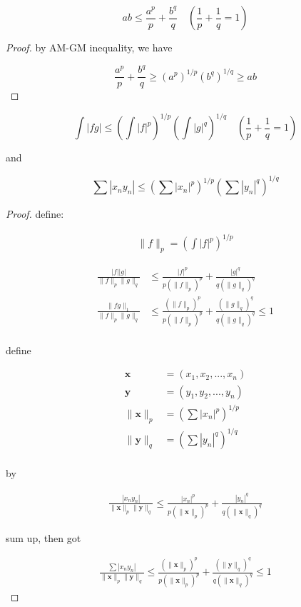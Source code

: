\documentclass[11pt,a4paper]{article}
\begin{document}
\begin{thm}
    \[
        ab \le \frac{a^p}{p} + \frac{b^q}{q} \quad \left( \frac{1}{p} + \frac{1}{q} = 1\right)
    \]
\end{thm}

\begin{proof}
   by AM-GM inequality, we have 

   \[
\frac{a^p}{p} + \frac{b^q}{q} \ge (a^p)^{1/p} (b^q)^{1/q} \ge ab
   \]
\end{proof}

\begin{thm}
    \[
        \int |fg| \le  \left(\int |f|^p \right)^{1/p} \left(\int |g|^q \right)^{1/q} \quad \left( \frac{1}{p} + \frac{1}{q} = 1\right)
    \] 

    and

    \[
        \sum |x_n y_n| \le \left(\sum |x_n|^p \right)^{1/p} \left(\sum |y_n|^q \right)^{1/q}
    \]
\end{thm}

\begin{proof}
    define:

    \begin{align*}
        \| f\|_p = \left(\int |f|^p \right)^{1/p}
    \end{align*}

   \begin{align*}
      \frac{|f||g|}{\| f\|_p\| g\|_q}  &\le \frac{|f|^p}{p (\| f\|_p)^p} +  \frac{|g|^q}{ q (\| g\|_q)^q} \\
      \frac{\| fg \|_1}{\| f\|_p\| g\|_q}  &\le \frac{(\| f\|_p)^p}{p (\| f\|_p)^p} +  \frac{(\| g\|_q)^q}{ q (\| g\|_q)^q} \le 1\\ 
   \end{align*} 

   define

   \begin{align*}
        \mathbf{x} &= (x_1,x_2,...,x_n) \\
        \mathbf{y} &= (y_1,y_2,...,y_n) \\
        \|\mathbf{x} \|_p &= \left(\sum |x_n|^p \right)^{1/p} \\ 
        \|\mathbf{y} \|_q &= \left(\sum |y_n|^q \right)^{1/q}  \\
   \end{align*}

   by

   \begin{align*}
        \frac{\left| x_n y_n\right|}{\|\mathbf{x} \|_p \|\mathbf{y} \|_q} \le \frac{|x_n|^p}{p \left(\|\mathbf{x} \|_p\right)^p} +  \frac{|y_n|^q}{q \left(\|\mathbf{x} \|_q\right)^q}
   \end{align*}

   sum up, then got


   \begin{align*}
        \frac{\sum \left| x_n y_n\right|}{\|\mathbf{x} \|_p \|\mathbf{y} \|_q} \le \frac{\left(\|\mathbf{x} \|_p\right)^p}{p \left(\|\mathbf{x} \|_p\right)^p} +  \frac{\left(\|\mathbf{y} \|_q\right)^q}{q \left(\|\mathbf{x} \|_q\right)^q} \le 1
   \end{align*}
\end{proof}
\end{document}
